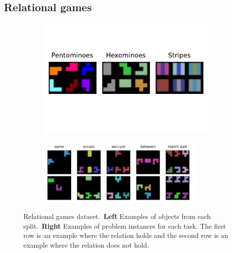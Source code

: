 \subsection{Relational games}\label{ssec:exp_relational_games}

\begin{figure}[t]
    \centering
    \begin{subfigure}[t]{0.37\textwidth}
        \centering
        \includegraphics[width=0.99\textwidth]{figs/relational_games_objects.pdf}
        \label{fig:relational_games_objects}
    \end{subfigure}
    \begin{subfigure}[t]{0.62\textwidth}
        \centering
        \includegraphics[width=0.9\textwidth]{figs/relational_games_tasks.pdf}
        \label{fig:relational_games_tasks}
    \end{subfigure}
    \vskip-10pt
    \caption{Relational games dataset.~\textbf{Left} Examples of objects from each split.~\textbf{Right} Examples of problem instances for each task. The first row is an example where the relation holds and the second row is an example where the relation does not hold.}\label{fig:relational_games_dataset}
    \vskip-12pt
\end{figure}

